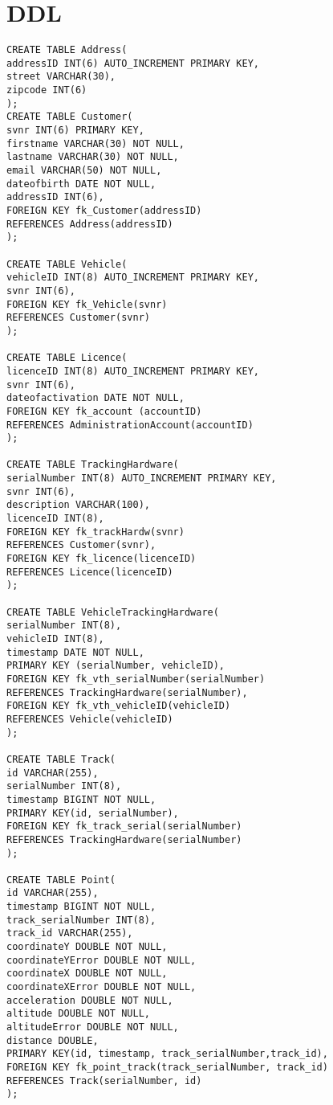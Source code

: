 \section{DDL}
\begin{verbatim}
CREATE TABLE Address(
addressID INT(6) AUTO_INCREMENT PRIMARY KEY,
street VARCHAR(30),
zipcode INT(6)
);
CREATE TABLE Customer(
svnr INT(6) PRIMARY KEY,
firstname VARCHAR(30) NOT NULL,
lastname VARCHAR(30) NOT NULL,
email VARCHAR(50) NOT NULL,
dateofbirth DATE NOT NULL,
addressID INT(6),
FOREIGN KEY fk_Customer(addressID)
REFERENCES Address(addressID)
);

CREATE TABLE Vehicle(
vehicleID INT(8) AUTO_INCREMENT PRIMARY KEY,
svnr INT(6),
FOREIGN KEY fk_Vehicle(svnr)
REFERENCES Customer(svnr)
);

CREATE TABLE Licence(
licenceID INT(8) AUTO_INCREMENT PRIMARY KEY,
svnr INT(6),
dateofactivation DATE NOT NULL,
FOREIGN KEY fk_account (accountID)
REFERENCES AdministrationAccount(accountID)
);

CREATE TABLE TrackingHardware(
serialNumber INT(8) AUTO_INCREMENT PRIMARY KEY,
svnr INT(6),
description VARCHAR(100),
licenceID INT(8),
FOREIGN KEY fk_trackHardw(svnr)
REFERENCES Customer(svnr),
FOREIGN KEY fk_licence(licenceID)
REFERENCES Licence(licenceID)
);

CREATE TABLE VehicleTrackingHardware(
serialNumber INT(8),
vehicleID INT(8),
timestamp DATE NOT NULL,
PRIMARY KEY (serialNumber, vehicleID),
FOREIGN KEY fk_vth_serialNumber(serialNumber)
REFERENCES TrackingHardware(serialNumber),
FOREIGN KEY fk_vth_vehicleID(vehicleID)
REFERENCES Vehicle(vehicleID)
);

CREATE TABLE Track(
id VARCHAR(255),
serialNumber INT(8),
timestamp BIGINT NOT NULL,
PRIMARY KEY(id, serialNumber),
FOREIGN KEY fk_track_serial(serialNumber)
REFERENCES TrackingHardware(serialNumber)
);

CREATE TABLE Point(
id VARCHAR(255),
timestamp BIGINT NOT NULL,
track_serialNumber INT(8),
track_id VARCHAR(255),
coordinateY DOUBLE NOT NULL,
coordinateYError DOUBLE NOT NULL,
coordinateX DOUBLE NOT NULL,
coordinateXError DOUBLE NOT NULL,
acceleration DOUBLE NOT NULL,
altitude DOUBLE NOT NULL,
altitudeError DOUBLE NOT NULL,
distance DOUBLE,
PRIMARY KEY(id, timestamp, track_serialNumber,track_id),
FOREIGN KEY fk_point_track(track_serialNumber, track_id)
REFERENCES Track(serialNumber, id)
);
\end{verbatim}
